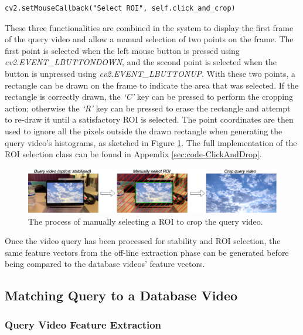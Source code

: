 \begin{lstlisting}[numbers=none]
cv2.setMouseCallback("Select ROI", self.click_and_crop)
\end{lstlisting}

These three functionalities are combined in the system to display the first frame of the query video and allow a manual selection of two points on the frame. The first point is selected when the left mouse button is pressed using \textit{cv2.EVENT\_LBUTTONDOWN}, and the second point is selected when the button is unpressed using \textit{cv2.EVENT\_LBUTTONUP}. With these two points, a rectangle can be drawn on the frame to indicate the area that was selected. If the rectangle is correctly drawn, the \textit{`C'} key can be pressed to perform the cropping action; otherwise the \textit{`R'} key can be pressed to erase the rectangle and attempt to re-draw it until a satisfactory ROI is selected. The point coordinates are then used to ignore all the pixels outside the drawn rectangle when generating the query video's histograms, as sketched in Figure \ref{fig:implementation-roi_selection}. The full implementation of the ROI selection class can be found in Appendix \ref{sec:code-ClickAndDrop}.\\

\begin{figure}[h] 
\centerline{\includegraphics[width=\textwidth]{figures/implementation/roi_selection.png}}
\caption{\label{fig:implementation-roi_selection}The process of manually selecting a ROI to crop the query video.}
\end{figure}

Once the video query has been processed for stability and ROI selection, the same feature vectors from the off-line extraction phase can be generated before being compared to the database videos' feature vectors.


\subsection{Matching Query to a Database Video}

\subsubsection{Query Video Feature Extraction}

